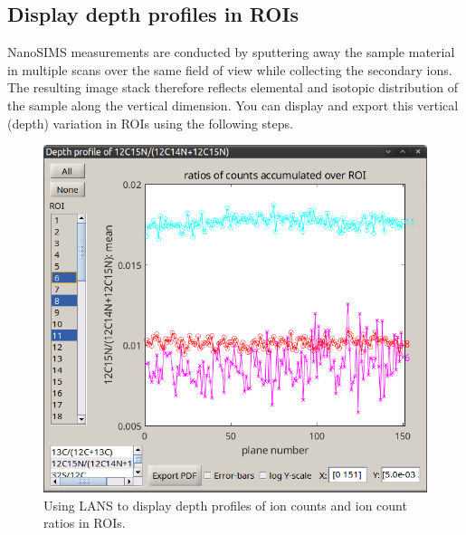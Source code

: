\subsection{Display depth profiles in ROIs}
\setcounter{step}{0}

\goldbox{}
NanoSIMS measurements are conducted by sputtering away the sample material in multiple scans over the same field of view while collecting the secondary ions. The resulting image stack therefore reflects elemental and isotopic distribution of the sample along the vertical dimension. You can display and export this vertical (depth) variation in ROIs using the following steps.
\tcbe






\begin{figure}[!hb]
\centering
\includegraphics[scale=0.39]{figs3/LANS-depth-profiles}
\caption{\label{fig:depth-profiles}%
Using LANS to display depth profiles of ion counts and ion count ratios in ROIs.}
\end{figure}

